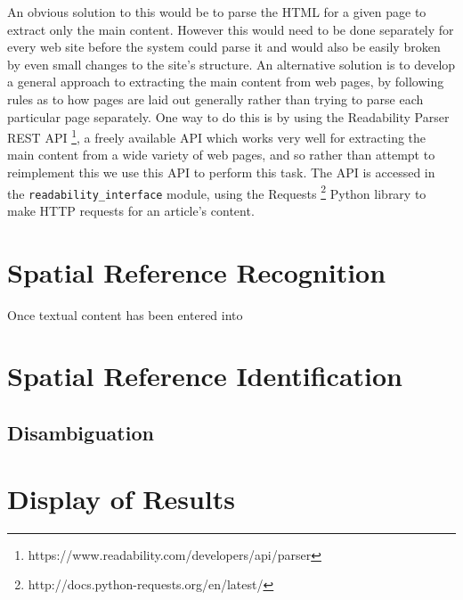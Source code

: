 \documentclass[12pt, a4paper]{report}
\begin{document}
An obvious solution to this would be to parse the HTML for a given page to extract only the main content. However this would need to be done separately for every web site before the system could parse it and would also be easily broken by even small changes to the site's structure. An alternative solution is to develop a general approach to extracting the main content from web pages, by following rules as to how pages are laid out generally rather than trying to parse each particular page separately. One way to do this is by using the Readability Parser REST API \footnote{https://www.readability.com/developers/api/parser}, a freely available API which works very well for extracting the main content from a wide variety of web pages, and so rather than attempt to reimplement this we use this API  to perform this task. The API is accessed in the \verb#readability_interface# module, using the Requests \footnote{http://docs.python-requests.org/en/latest/} Python library to make HTTP requests for an article's content.

\section{Spatial Reference Recognition}

Once textual content has been entered into




\section{Spatial Reference Identification}
\label{sec_spatial_reference_identification}




\subsection{Disambiguation}


\section{Display of Results}
\end{document}
